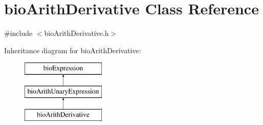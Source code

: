 \hypertarget{classbio_arith_derivative}{}\section{bio\+Arith\+Derivative Class Reference}
\label{classbio_arith_derivative}


{\ttfamily \#include $<$bio\+Arith\+Derivative.\+h$>$}

Inheritance diagram for bio\+Arith\+Derivative\+:\begin{figure}[H]
\begin{center}
\leavevmode
\includegraphics[height=3.000000cm]{classbio_arith_derivative}
\end{center}
\end{figure}
